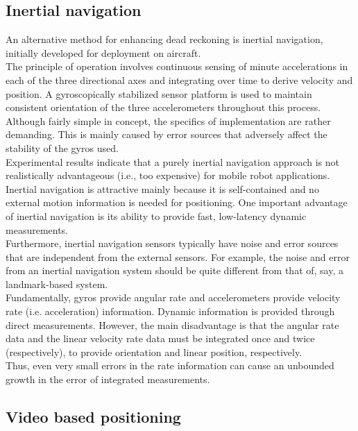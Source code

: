 \subsection{Inertial navigation}
\label{intro:mobile:inertial}

An alternative method for enhancing dead reckoning is
inertial navigation, initially developed for deployment on
aircraft.
\\
The principle of operation involves continuous sensing of minute
accelerations in each of the three directional axes and integrating over time
to derive velocity and position. A gyroscopically stabilized
sensor platform is used to maintain consistent orientation of the three
accelerometers throughout this process.
\\
Although fairly simple in concept, the specifics of implementation are
rather demanding. This is mainly caused by error sources that adversely
affect the stability of the gyros used.
\\
Experimental results indicate that a purely inertial navigation approach
is not realistically advantageous (i.e., too expensive) for mobile robot
applications.
\\
Inertial navigation is attractive mainly because it is self-contained
and no external motion information is needed for positioning. One important
advantage of inertial navigation is its ability to provide fast, low-latency
dynamic measurements.
\\
Furthermore, inertial navigation sensors typically have noise and error sources
that are independent from the external sensors. For example, the noise and error
from an inertial navigation system should be quite different
from that of, say, a landmark-based system.
\\
Fundamentally, gyros provide angular rate and accelerometers provide
velocity rate (i.e. acceleration) information. Dynamic information is
provided through direct
measurements. However, the main disadvantage is that the angular rate data
and the linear velocity rate data must be integrated once and twice (respectively),
to provide orientation and linear position, respectively.
\\
Thus, even very small errors in the rate information can cause an unbounded
growth in the error of integrated measurements.

\subsection{Video based positioning}
\label{intro:mobile:video}

